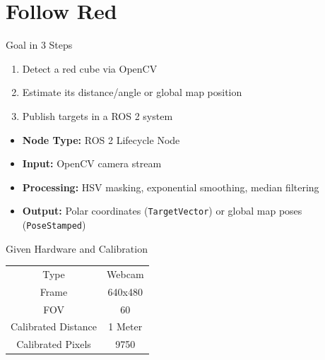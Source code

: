 \documentclass[aspectratio=169, 11pt]{beamer}
\newcommand{\fullsectiontitle}{}
\newcommand{\presentationsection}[2][]{%
  \gdef\fullsectiontitle{#2}%
  \section[#1]{#2}%
}
\begin{document}
\presentationsection[Follow Red]{Follow Red}
\begin{frame}{Goal in 3 Steps}
    \begin{enumerate}
        \item Detect a red cube via OpenCV
        \item Estimate its distance/angle or global map position 
        \item Publish targets in a ROS 2 system
    \end{enumerate}

    \vspace{0.3cm}
    \begin{itemize}
        \item \textbf{Node Type:} ROS 2 Lifecycle Node
        \item \textbf{Input:} OpenCV camera stream
        \item \textbf{Processing:} HSV masking, exponential smoothing, median filtering
        \item \textbf{Output:} Polar coordinates (\texttt{TargetVector}) or global map poses (\texttt{PoseStamped})
    \end{itemize}
\end{frame}

\begin{frame}{Given Hardware and Calibration}
    \begin{table}[]
        \centering
        \begin{tabular}{c|c}
             Type & Webcam \\
             Frame & 640x480 \\
             FOV & 60 \\
             Calibrated Distance & 1 Meter \\
             Calibrated Pixels & 9750
        \end{tabular}
    \end{table}
\end{frame}
\end{document}
